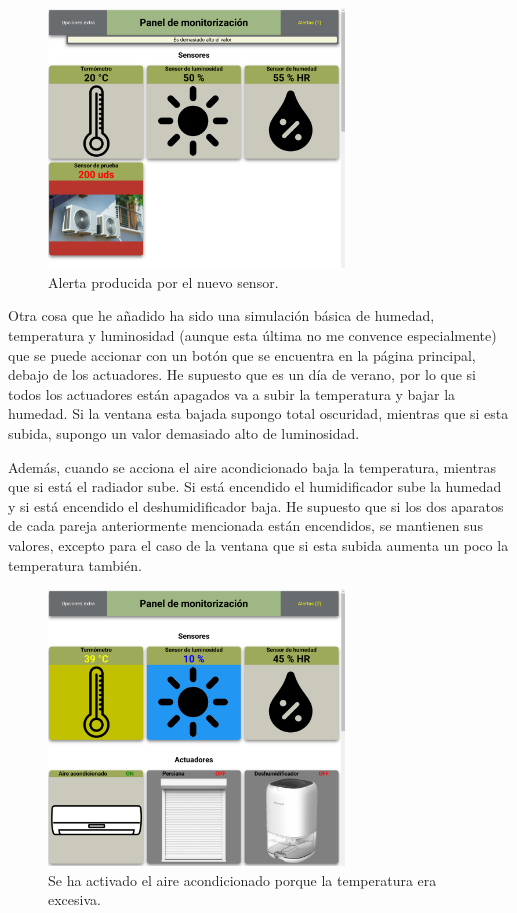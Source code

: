 \documentclass{article}
\begin{document}
\begin{figure}[H]
    \centering
    \includegraphics[width=0.7\textwidth]{images/nuevosensoralerta.png}
    \caption{Alerta producida por el nuevo sensor.}
\end{figure}

Otra cosa que he añadido ha sido una simulación básica de humedad, temperatura y luminosidad (aunque esta última no me convence especialmente) que se puede accionar con un botón que se encuentra en la página principal, debajo de los actuadores. He supuesto que es un día de verano, por lo que si todos los actuadores están apagados va a subir la temperatura y bajar la humedad. Si la ventana esta bajada supongo total oscuridad, mientras que si esta subida, supongo un valor demasiado alto de luminosidad.

Además, cuando se acciona el aire acondicionado baja la temperatura, mientras que si está el radiador sube. Si está encendido el humidificador sube la humedad y si está encendido el deshumidificador baja. He supuesto que si los dos aparatos de cada pareja anteriormente mencionada están encendidos, se mantienen sus valores, excepto para el caso de la ventana que si esta subida aumenta un poco la temperatura también.

\begin{figure}[H]
    \centering
    \includegraphics[width=0.7\textwidth]{images/sim.png}
    \caption{Se ha activado el aire acondicionado porque la temperatura era excesiva.}
\end{figure}
\end{document}
